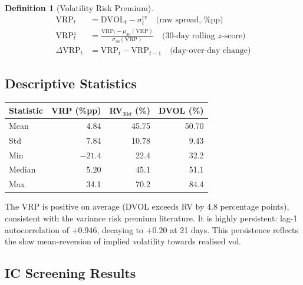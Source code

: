 \documentclass[12pt, a4paper]{article}
\theoremstyle{plain}
\theoremstyle{definition}
\newtheorem{definition}{Definition}[section]
\newcommand{\DVOL}{\mathrm{DVOL}}
\newcommand{\VRP}{\mathrm{VRP}}
\begin{document}
\begin{definition}[Volatility Risk Premium]
  \begin{align}
    \VRP_t &= \DVOL_t - \sigma^{\mathrm{rv}}_t
      \quad\text{(raw spread, \%pp)} \\
    \VRP^z_t &= \frac{\VRP_t - \mu_{30}(\VRP)}{\sigma_{30}(\VRP)}
      \quad\text{(30-day rolling $z$-score)} \\
    \Delta\VRP_t &= \VRP_t - \VRP_{t-1}
      \quad\text{(day-over-day change)}
  \end{align}
\end{definition}

\subsection{Descriptive Statistics}

\begin{center}
\begin{tabular}{lrrr}
\toprule
Statistic & VRP (\%pp) & RV$_{30d}$ (\%) & DVOL (\%) \\
\midrule
Mean   &  4.84 & 45.75 & 50.70 \\
Std    &  7.84 & 10.78 &  9.43 \\
Min    & $-21.4$ & 22.4  & 32.2  \\
Median &  5.20 & 45.1  & 51.1  \\
Max    & 34.1  & 70.2  & 84.4  \\
\bottomrule
\end{tabular}
\end{center}

The VRP is positive on average (DVOL exceeds RV by 4.8 percentage
points), consistent with the variance risk premium literature.  It is
highly persistent: lag-1 autocorrelation of $+0.946$, decaying to
$+0.20$ at 21 days.  This persistence reflects the slow mean-reversion
of implied volatility towards realised vol.

\subsection{IC Screening Results}
\end{document}
